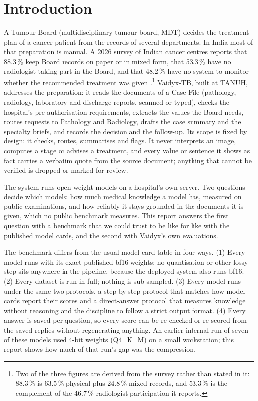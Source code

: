 \documentclass{article}
\newcommand{\pct}{\,\%}
\begin{document}

\section{Introduction}

A Tumour Board (multidisciplinary tumour board, MDT) decides the treatment plan of a cancer patient from the records of several departments. In India most of that preparation is manual. A 2026 survey of Indian cancer centres reports that 88.3\pct{} keep Board records on paper or in mixed form, that 53.3\pct{} have no radiologist taking part in the Board, and that 48.2\pct{} have no system to monitor whether the recommended treatment was given \citep{sarveswaran2026}.\footnote{Two of the three figures are derived from the survey rather than stated in it: 88.3\pct{} is 63.5\pct{} physical plus 24.8\pct{} mixed records, and 53.3\pct{} is the complement of the 46.7\pct{} radiologist participation it reports.} Vaidyx-TB, built at TANUH, addresses the preparation: it reads the documents of a Case File (pathology, radiology, laboratory and discharge reports, scanned or typed), checks the hospital's pre-authorisation requirements, extracts the values the Board needs, routes requests to Pathology and Radiology, drafts the case summary and the specialty briefs, and records the decision and the follow-up. Its scope is fixed by design: it checks, routes, summarises and flags. It never interprets an image, computes a stage or advises a treatment, and every value or sentence it shows as fact carries a verbatim quote from the source document; anything that cannot be verified is dropped or marked for review.

The system runs open-weight models on a hospital's own server. Two questions decide which models: how much medical knowledge a model has, measured on public examinations, and how reliably it stays grounded in the documents it is given, which no public benchmark measures. This report answers the first question with a benchmark that we could trust to be like for like with the published model cards, and the second with Vaidyx's own evaluations.

The benchmark differs from the usual model-card table in four ways. (1) Every model runs with its exact published bf16 weights; no quantisation or other lossy step sits anywhere in the pipeline, because the deployed system also runs bf16. (2) Every dataset is run in full; nothing is sub-sampled. (3) Every model runs under the same two protocols, a step-by-step protocol that matches how model cards report their scores and a direct-answer protocol that measures knowledge without reasoning and the discipline to follow a strict output format. (4) Every answer is saved per question, so every score can be re-checked or re-scored from the saved replies without regenerating anything. An earlier internal run of seven of these models used 4-bit weights (Q4\_K\_M) on a small workstation; this report shows how much of that run's gap was the compression.
\end{document}
